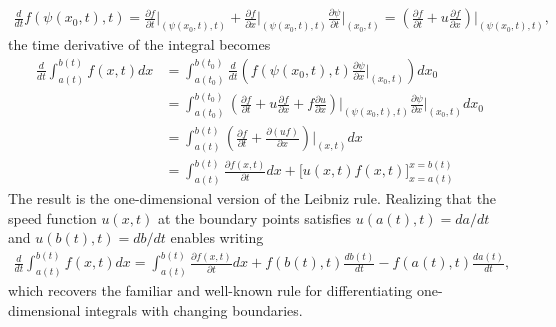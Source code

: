 \begin{example}
\begin{align*}
        \frac{d}{dt}f(\psi(x_0,t),t)=\frac{\partial f}{\partial t}\Big|_{(\psi(x_0,t),t)}+\frac{\partial f}{\partial x}\Big|_{(\psi(x_0,t),t)}\frac{\partial \psi}{\partial  t}\Big|_{(x_0,t)}=\left(\frac{\partial f}{\partial t}+u\frac{\partial f}{\partial x}\right)\Big|_{(\psi(x_0,t),t)},
    \end{align*}
    the time derivative of the integral becomes
    \begin{align*}
        \frac{d}{dt}\int_{a(t)}^{b(t)} f(x,t) dx&=\int_{a(t_0)}^{b(t_0)}\frac{d}{dt}\left(f(\psi(x_0,t),t)\frac{\partial\psi}{\partial x}\Big|_{(x_0,t)}\right)dx_0\\
        &=\int_{a(t_0)}^{b(t_0)}\left(\frac{\partial f}{\partial t}+u\frac{\partial f}{\partial x}+f\frac{\partial u}{\partial x}\right)\Big|_{(\psi(x_0,t),t)}\frac{\partial\psi}{\partial x}\Big|_{(x_0,t)}dx_0\\
        &=\int_{a(t)}^{b(t)}\left(\frac{\partial f}{\partial t}+\frac{\partial(uf)}{\partial x}\right)\Big|_{(x,t)}dx\\
        &=\int_{a(t)}^{b(t)}\frac{\partial f(x,t)}{\partial t}dx+\Big[u(x,t)f(x,t)\Big]_{x=a(t)}^{x=b(t)}
    \end{align*}
    The result is the one-dimensional version of the Leibniz rule. 
    Realizing that the speed function $u(x,t)$ at the boundary points satisfies $u(a(t),t)=da/dt$ and $u(b(t),t)=db/dt$ enables writing
    \begin{align*}
        \frac{d}{dt}\int_{a(t)}^{b(t)}f(x,t)dx=\int_{a(t)}^{b(t)}\frac{\partial f(x,t)}{\partial t}dx+f(b(t),t)\frac{db(t)}{dt}-f(a(t),t)\frac{da(t)}{dt},
    \end{align*}
    which recovers the familiar and well-known rule for differentiating one-dimensional integrals with changing boundaries.
\end{example}


